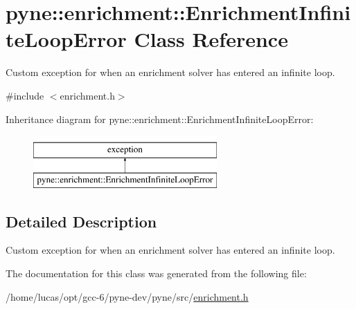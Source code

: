 \hypertarget{classpyne_1_1enrichment_1_1_enrichment_infinite_loop_error}{}\section{pyne\+:\+:enrichment\+:\+:Enrichment\+Infinite\+Loop\+Error Class Reference}
\label{classpyne_1_1enrichment_1_1_enrichment_infinite_loop_error}


Custom exception for when an enrichment solver has entered an infinite loop.  




{\ttfamily \#include $<$enrichment.\+h$>$}

Inheritance diagram for pyne\+:\+:enrichment\+:\+:Enrichment\+Infinite\+Loop\+Error\+:\begin{figure}[H]
\begin{center}
\leavevmode
\includegraphics[height=2.000000cm]{classpyne_1_1enrichment_1_1_enrichment_infinite_loop_error}
\end{center}
\end{figure}


\subsection{Detailed Description}
Custom exception for when an enrichment solver has entered an infinite loop. 

The documentation for this class was generated from the following file\+:\begin{DoxyCompactItemize}
\item 
/home/lucas/opt/gcc-\/6/pyne-\/dev/pyne/src/\hyperlink{enrichment_8h}{enrichment.\+h}\end{DoxyCompactItemize}
